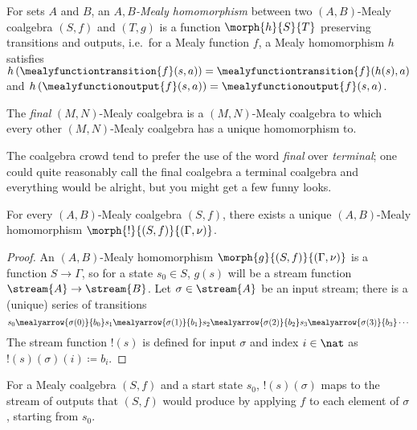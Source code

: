 \begin{definition}
    For sets \(A\) and \(B\), an \emph{\(A,B\)-Mealy homomorphism} between two
    \((A,B)\)-Mealy coalgebra \((S,f)\) and \((T,g)\) is a function
    \(\morph{h}{S}{T}\) preserving transitions and
    outputs, i.e.\ for a Mealy function \(f\), a Mealy homomorphism \(h\)
    satisfies \(
        h\left(\mealyfunctiontransition{f}(s, a)\right)
        =
        \mealyfunctiontransition{f}(h(s), a)
    \) and \(
        h\left(\mealyfunctionoutput{f}(s, a)\right)
        =
        \mealyfunctionoutput{f}(s, a)
    \).
\end{definition}

The \emph{final} \((M,N)\)-Mealy coalgebra is a \((M,N)\)-Mealy coalgebra to
which every other \((M,N)\)-Mealy coalgebra has a unique homomorphism to.

\begin{remark}
    The coalgebra crowd tend to prefer the use of the word \emph{final} over
    \emph{terminal}; one could quite reasonably call the final coalgebra a
    terminal coalgebra and everything would be alright, but you might get a few
    funny looks.
\end{remark}

\begin{proposition}
    \label{prop:final-coalgebra}
    For every \((A,B)\)-Mealy coalgebra \((S,f)\), there exists a
    unique \((A,B)\)-Mealy homomorphism \(\morph{{!}}{(S,f)}{(\Gamma,\nu)}\).
\end{proposition}
\begin{proof}
    An \((A,B)\)-Mealy homomorphism \(\morph{g}{(S, f)}{(\Gamma, \nu)}\) is a
    function \(S \to \Gamma\), so for a state \(s_0 \in S\), \(g(s)\) will be a
    stream function \(\stream{A} \to \stream{B}\).
    Let \(\sigma \in \stream{A}\) be an input stream; there is a (unique) series
    of transitions \[
        s_0
        \mealyarrow{\sigma(0)}{b_0}
        s_1
        \mealyarrow{\sigma(1)}{b_1}
        s_2
        \mealyarrow{\sigma(2)}{b_2}
        s_3
        \mealyarrow{\sigma(3)}{b_3}
        \cdots
    \]
    The stream function \(!(s)\) is defined for input \(\sigma\) and
    index \(i \in \nat\) as \(!(s)(\sigma)(i) \coloneqq b_i\).
\end{proof}

For a Mealy coalgebra \((S, f)\) and a start state \(s_0\),
\(!(s)(\sigma)\) maps to the stream of outputs that \((S, f)\) would produce
by applying \(f\) to each element of \(\sigma\), starting from \(s_0\).

